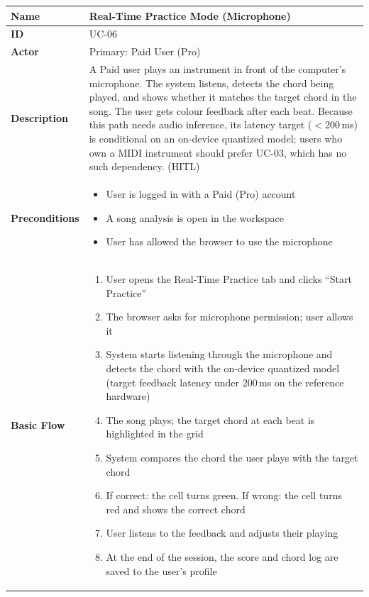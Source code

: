 \documentclass[a4paper]{article}
\newlength{\ucLeft}
\begin{document}
\begin{longtable}{|>{\bfseries}p{\ucLeft}|p{\dimexpr\linewidth-\ucLeft-2\tabcolsep-2\arrayrulewidth}|}
\hline
Name & Real-Time Practice Mode (Microphone) \\ \hline
ID & UC-06 \\ \hline
Actor & Primary: Paid User (Pro) \\ \hline
Description & A Paid user plays an instrument in front of the computer's microphone. The system listens, detects the chord being played, and shows whether it matches the target chord in the song. The user gets colour feedback after each beat. Because this path needs audio inference, its latency target ($<$200\,ms) is conditional on an on-device quantized model; users who own a MIDI instrument should prefer UC-03, which has no such dependency. (HITL) \\ \hline
Preconditions &
\begin{itemize}[leftmargin=1em, nosep, topsep=2pt, partopsep=0pt, parsep=0pt, after=\strut]
    \item User is logged in with a Paid (Pro) account
    \item A song analysis is open in the workspace
    \item User has allowed the browser to use the microphone
\end{itemize}
\\ \hline
Basic Flow &
\begin{enumerate}[leftmargin=1.5em, nosep, topsep=2pt, partopsep=0pt, parsep=0pt, after=\strut]
    \item User opens the Real-Time Practice tab and clicks ``Start Practice''
    \item The browser asks for microphone permission; user allows it
    \item System starts listening through the microphone and detects the chord with the on-device quantized model (target feedback latency under 200\,ms on the reference hardware)
    \item The song plays; the target chord at each beat is highlighted in the grid
    \item System compares the chord the user plays with the target chord
    \item If correct: the cell turns green. If wrong: the cell turns red and shows the correct chord
    \item User listens to the feedback and adjusts their playing
    \item At the end of the session, the score and chord log are saved to the user's profile

\end{enumerate}
\end{longtable}
\end{document}
